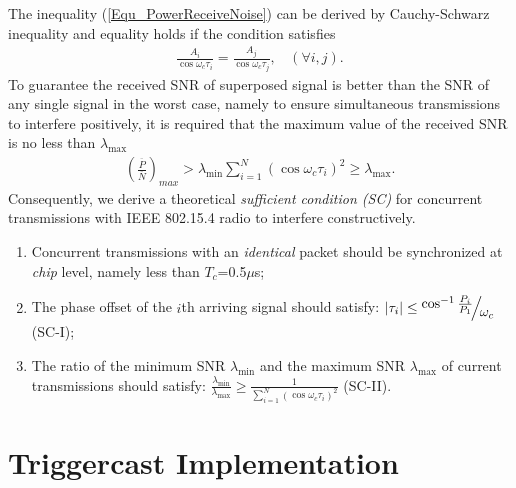 \documentclass[conference]{IEEEtran}
\begin{document}
The inequality (\ref{Equ_PowerReceiveNoise}) can be derived by Cauchy-Schwarz inequality and equality holds if the condition satisfies
\begin{align}
\label{Equ_equation}
\frac{{A_i }}{{\cos \omega _c \tau _i }} =\frac{{A_j }}{{\cos \omega _c \tau _j }},~~~~(\forall i,j).
\end{align}
To guarantee the received SNR of superposed signal is better than the SNR of any single signal in the worst case, namely to ensure simultaneous transmissions to interfere positively, it is required that the maximum value of the received SNR is no less than $\lambda _{\max }$
\begin{align}
\label{Equ_minmax}
({\frac{\overline{P}}{\overline{N}}})_{max}>\lambda _{\min } \sum\limits_{i = 1}^N {(\cos \omega _c \tau _i )^2 } \geq \lambda _{\max }.
\end{align}
Consequently, we derive a theoretical \emph{sufficient condition (SC)} for concurrent transmissions with IEEE 802.15.4 radio to interfere constructively.
\begin{enumerate}
\setlength{\itemsep}{-0.245ex}
\item
Concurrent transmissions with an \emph{identical} packet should be synchronized at \emph{chip} level, namely less than $T_c$=0.5$\mu$s;
\item
The phase offset of the $i$th arriving signal should satisfy: $\left| {\tau _i } \right| \le {\raise0.7ex\hbox{${\cos ^{ - 1} \frac{{P_i }}{{P_1 }}}$} \!\mathord{\left/
 {\vphantom {{\cos ^{ - 1} \frac{{P_i }}{{P_1 }}} {\omega _c }}}\right.\kern-\nulldelimiterspace}
\!\lower0.7ex\hbox{${\omega _c }$}}$ (SC-I);
\item
The ratio of the minimum SNR $\lambda _{\min}$ and the maximum SNR $\lambda _{\max}$ of current transmissions should satisfy:
$\frac{{\lambda _{\min } }}{{\lambda _{\max } }} \ge \frac{1}{{\sum\limits_{i = 1}^N {(\cos \omega _c \tau _i )^2 } }}$ (SC-II).
\end{enumerate}
\section{Triggercast Implementation}
\end{document}
